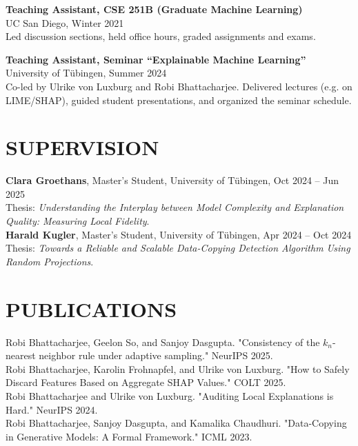 \documentclass{res}
\begin{document}
\begin{resume}
\textbf{Teaching Assistant, CSE 251B (Graduate Machine Learning)} \\
UC San Diego, Winter 2021 \\
Led discussion sections, held office hours, graded assignments and exams.

\textbf{Teaching Assistant, Seminar “Explainable Machine Learning”} \\
University of Tübingen, Summer 2024 \\
Co-led by Ulrike von Luxburg and Robi Bhattacharjee. Delivered lectures (e.g. on LIME/SHAP), guided student presentations, and organized the seminar schedule.

\section{SUPERVISION}

\textbf{Clara Groethans}, Master’s Student, University of Tübingen, Oct 2024 – Jun 2025 \\
Thesis: \textit{Understanding the Interplay between Model Complexity and Explanation Quality: Measuring Local Fidelity}. \\[0.5em]

\textbf{Harald Kugler}, Master’s Student, University of Tübingen, Apr 2024 – Oct 2024 \\
Thesis: \textit{Towards a Reliable and Scalable Data-Copying Detection Algorithm Using Random Projections}. \\

\section{PUBLICATIONS}

Robi Bhattacharjee, Geelon So, and Sanjoy Dasgupta. "Consistency of the $k_n$-nearest neighbor rule under adaptive sampling." NeurIPS 2025. \\

Robi Bhattacharjee, Karolin Frohnapfel, and Ulrike von Luxburg. "How to Safely Discard Features Based on Aggregate SHAP Values." COLT 2025. \\

Robi Bhattacharjee and Ulrike von Luxburg. "Auditing Local Explanations is Hard." NeurIPS 2024. \\

Robi Bhattacharjee, Sanjoy Dasgupta, and Kamalika Chaudhuri. "Data-Copying in Generative Models: A Formal Framework." ICML 2023. \\


\end{resume}
\end{document}
